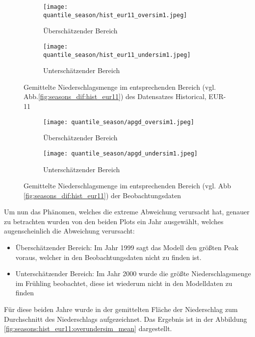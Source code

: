 \begin{figure}[h]
	\begin{subfigure}{0.49\textwidth}
		\texttt{[image: quantile\_season/hist\_eur11\_oversim1.jpeg]}
		\caption{Überschätzender Bereich}
		\label{fig:season:over_hist}
	\end{subfigure}
	\begin{subfigure}{0.49\textwidth}
	\texttt{[image: quantile\_season/hist\_eur11\_undersim1.jpeg]}
	\caption{Unterschätzender Bereich}
	\label{fig:season:under_hist}
	\end{subfigure}
	\caption{Gemittelte Niederschlagsmenge im entsprechenden Bereich (vgl. Abb.\ref{fig:seasons_dif:hist_eur11}) des Datensatzes Historical, EUR-11}
\end{figure}
\begin{figure}[h]
	\begin{subfigure}{0.49\textwidth}
		\texttt{[image: quantile\_season/apgd\_oversim1.jpeg]}
		\caption{Überschätzender Bereich}
		\label{fig:season:over_apgd}
	\end{subfigure}
	\begin{subfigure}{0.49\textwidth}
		\texttt{[image: quantile\_season/apgd\_undersim1.jpeg]}
		\caption{Unterschätzender Bereich}
	\label{fig:season:under_apgd}
	\end{subfigure}
	\caption{Gemittelte Niederschlagsmenge im entsprechenden Bereich (vgl. Abb \ref{fig:seasons_dif:hist_eur11}) der Beobachtungsdaten}
\end{figure}

Um nun das Phänomen, welches die extreme Abweichung verursacht hat, genauer zu betrachten wurden von den beiden Plots ein Jahr ausgewählt, welches augenscheinlich die Abweichung verursacht:
\begin{itemize}
	\item Überschätzender Bereich: Im Jahr 1999 sagt das Modell den größten Peak voraus, welcher in den Beobachtungsdaten nicht zu finden ist.
	\item Unterschätzender Bereich: Im Jahr 2000 wurde die größte Niederschlagsmenge im Frühling beobachtet, diese ist wiederum nicht in den Modelldaten zu finden
\end{itemize}
Für diese beiden Jahre wurde in der gemittelten Fläche der Niederschlag zum Durchschnitt des Niederschlags aufgezeichnet. Das Ergebnis ist in der Abbildung \ref{fig:seasons:hist_eur11:overundersim_mean} dargestellt.\\

